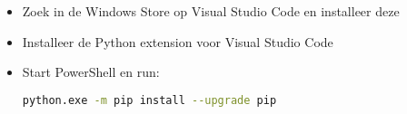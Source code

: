 \begin{itemize}
\item Zoek in de Windows Store op Visual Studio Code en installeer deze
\item Installeer de Python extension voor Visual Studio Code
\item Start PowerShell en run:
\begin{lstlisting}[language=bash]
python.exe -m pip install --upgrade pip
\end{lstlisting}
\end{itemize}
